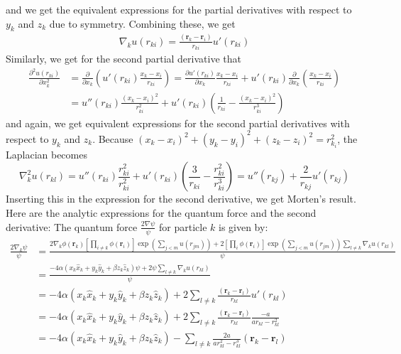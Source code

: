 \documentclass[%
oneside,                 %
final,                   %
10pt]{article}
\begin{document}
and we get the equivalent expressions for the partial derivatives with respect to $y_k$ and $z_k$ due to symmetry. Combining these, we get 
\begin{align*}
    \nabla_k u(r_{ki})=\frac{(\mathbf{r}_k-\mathbf{r}_i)}{r_{ki}}u'(r_{ki})
\end{align*}
Similarly, we get for the second partial derivative that 
\begin{align*}
    \frac{\partial^2 u(r_{ki})}{\partial x_k^2}&=\frac{\partial }{\partial x_k}\left(u'(r_{ki})\frac{x_k-x_i}{r_{ki}}\right)= \frac{\partial u'(r_{ki})}{\partial x_k}\frac{x_k-x_i}{r_{ki}}+u'(r_{ki})\frac{\partial }{\partial x_k}\left(\frac{x_k-x_i}{r_{ki}}\right)\\ &= u''(r_{ki})\frac{(x_k-x_i)^2}{r_{ki}^2}+u'(r_{ki})\left(\frac{1}{r_{ki}}-\frac{(x_k-x_i)^2}{r_{ki}^3}\right)
\end{align*}
and again, we get equivalent expressions for the second partial derivatives with respect to $y_k$ and $z_k$. Because $(x_k-x_i)^2+(y_k-y_i)^2+(z_k-z_i)^2=r_{k_i}^2$, the Laplacian becomes
\begin{equation*}
    \nabla_k^2 u(r_{kl})=u''(r_{ki})\frac{r_{ki}^2}{r_{ki}^2}+u'(r_{ki})\left(\frac{3}{r_{ki}}-\frac{r_{ki}^2}{r_{ki}^3}\right)= u''(r_{kj})+\frac{2}{r_{kj}}u'(r_{kj})
\end{equation*}
Inserting this in the expression for the second derivative, we get Morten's result.\\
Here are the analytic expressions for the quantum force and the second derivative:
The quantum force $\frac{2\nabla\psi}{\psi}$ for particle $k$ is given by:
\begin{equation*}
\begin{split}
 \frac{2\nabla_k\psi}{\psi} &=\frac{2\nabla_k\phi(\mathbf{r}_k)\left[\prod_{i\ne k}\phi(\mathbf{r}_i)\right]\exp{\left(\sum_{j<m}u(r_{jm})\right)} +  2\left[\prod_i\phi(\mathbf{r}_i)\right]
  \exp{\left(\sum_{j<m}u(r_{jm})\right)}\sum_{l\ne k}\nabla_k u(r_{kl})}{\psi}\\
  &= \frac{-4\alpha(x_k \hat{x}_k+y_k \hat{y}_k+\beta z_k \hat{z}_k)\psi+2\psi\sum_{l\ne k}\nabla_k u(r_{kl})}{\psi}\\
  &=-4\alpha(x_k \hat{x}_k+y_k \hat{y}_k+\beta z_k \hat{z}_k)+2\sum_{l\ne k}\frac{(\mathbf{r}_k-\mathbf{r}_l)}{r_{kl}}u'(r_{kl})\\
  &= -4\alpha(x_k \hat{x}_k+y_k \hat{y}_k+\beta z_k \hat{z}_k)+2\sum_{l\ne k}\frac{(\mathbf{r}_k-\mathbf{r}_l)}{r_{kl}}\frac{-a}{ar_{kl}-r^2_{kl}}\\
  &= -4\alpha(x_k \hat{x}_k+y_k \hat{y}_k+\beta z_k \hat{z}_k)-\sum_{l\ne k}\frac{2a}{ar^2_{kl}-r^3_{kl}}{(\mathbf{r}_k-\mathbf{r}_l)}
\end{split}
  \end{equation*}
\end{document}
